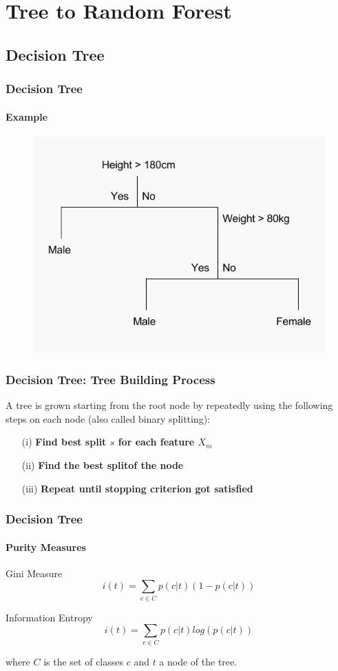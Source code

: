 \section{Tree to Random Forest}
\subsection{Decision Tree}

\begin{frame}
	\frametitle{Decision Tree}
	\framesubtitle{Example}
	\begin{figure}		
		\includegraphics[height=0.7\textheight]{images/decision_tree_example.png}
	\end{figure}
\end{frame}

\begin{frame}
	\frametitle{Decision Tree: Tree Building Process}
	A tree is grown starting from the root node by repeatedly 
	using the following steps on each node (also called binary splitting):
	\begin{enumerate}
		\item[(i)] \textbf{Find best split \(s\) for each feature \(X_{m}\)}
		\item[(ii)] \textbf{Find the best splitof the node}
		\item[(iii)] \textbf{Repeat until stopping criterion got satisfied}
	\end{enumerate}
\end{frame}	

\begin{frame}
	\frametitle{Decision Tree}
	\framesubtitle{Purity Measures}
	\begin{block}{Gini Measure}
		\begin{equation*}    
			i(t) = \sum_{c \in C} p(c|t) (1 - p(c|t))
		\end{equation*}
	\end{block}
	\begin{block}{Information Entropy}
		\begin{equation*}    
			i(t) = \sum_{c \in C} p(c|t) log(p(c|t))
		\end{equation*}
	\end{block}	
	where $C$ is the set of classes $c$ and $t$ a node of the tree.
\end{frame}
